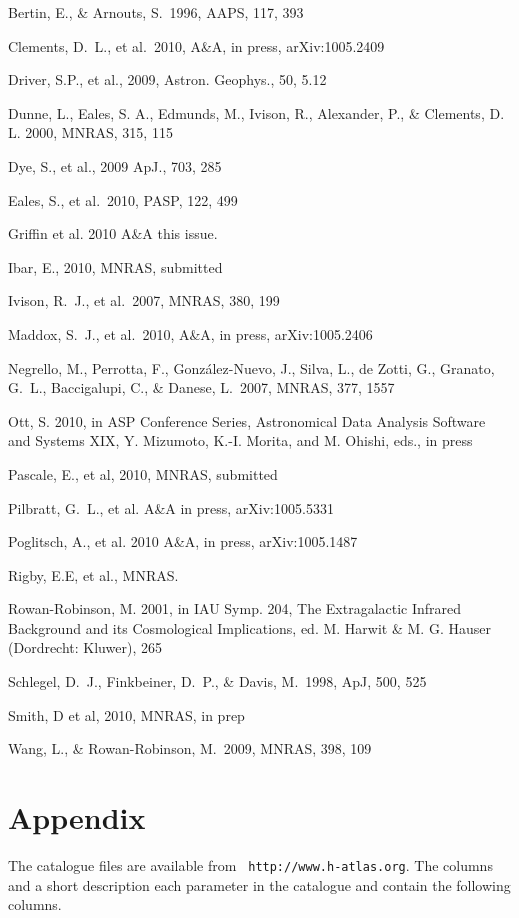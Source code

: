 \documentclass[useAMS,usenatbib]{mn2e}
\def\apj{ApJ}
\def\mnras{MNRAS}
\def\aaps{AAPS}
\def\pasp{PASP}
\begin{document}
\begin{thebibliography}{}

 Bertin, E., \& Arnouts, S.\ 1996, \aaps, 117, 393 

 Clements, D.~L., et  al.\ 2010,  A\&A, in press, arXiv:1005.2409 

Driver, S.P., et al., 2009,
  Astron. Geophys.,  50, 5.12

 Dunne, L., Eales, S. A., Edmunds,
  M., Ivison, R., Alexander, P., \& Clements, D. L. 2000, MNRAS, 315,
  115

Dye, S., et al., 2009 ApJ., 703, 285

 Eales, S., et al.\ 2010,  \pasp, 122, 499 

 Griffin et al. 2010 A\&A this issue.

 Ibar, E., 2010, MNRAS, submitted

 Ivison, R.~J., et al.\ 2007, \mnras, 380, 199 

 Maddox, S.~J., et al.\  2010,  A\&A, in press, arXiv:1005.2406 

 Negrello, M., 
Perrotta, F., Gonz{\'a}lez-Nuevo, J., Silva, L., de Zotti, G., Granato, 
G.~L., Baccigalupi, C., \& Danese, L.\ 2007, \mnras, 377, 1557 

 Ott, S. 2010, in ASP Conference Series, Astronomical Data Analysis 
Software and Systems XIX, Y. Mizumoto, K.-I. Morita, and M. Ohishi, eds., in press 

Pascale, E., et al, 2010, MNRAS, submitted

 Pilbratt, G.~L., et al. A\&A in press, arXiv:1005.5331 

 Poglitsch, A., et al. 2010 A\&A, in press, arXiv:1005.1487 

 Rigby, E.E, et al., MNRAS. 

 Rowan-Robinson, M. 2001, in IAU
  Symp. 204, The Extragalactic Infrared Background and its
  Cosmological Implications, ed. M. Harwit \& M. G.  Hauser (Dordrecht:
  Kluwer), 265


 Schlegel, D.~J., 
Finkbeiner, D.~P., \& Davis, M.\ 1998, \apj, 500, 525 

 Smith, D et al, 2010,  MNRAS, in prep

 Wang, L., \& Rowan-Robinson, M.\ 2009, \mnras, 398, 109 

\end{thebibliography}
\section{Appendix}

The catalogue files are available from {\tt
  http://www.h-atlas.org}. The columns and a short description each
parameter in the catalogue
and contain the following columns. 


\label{lastpage}
\end{document}
